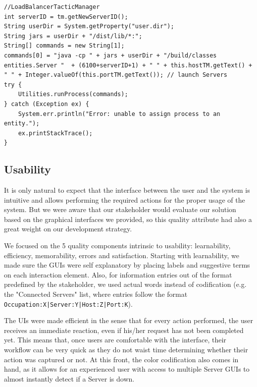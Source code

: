 \documentclass[12pt]{article}
\begin{document}
\begin{lstlisting}
//LoadBalancerTacticManager
int serverID = tm.getNewServerID();
String userDir = System.getProperty("user.dir");
String jars = userDir + "/dist/lib/*:";
String[] commands = new String[1];
commands[0] = "java -cp " + jars + userDir + "/build/classes entities.Server "  + (6100+serverID+1) + " " + this.hostTM.getText() + " " + Integer.valueOf(this.portTM.getText()); // launch Servers
try {
    Utilities.runProcess(commands);
} catch (Exception ex) {
    System.err.println("Error: unable to assign process to an entity.");
    ex.printStackTrace();
}
\end{lstlisting}

\subsection{Usability} \label{usability}

It is only natural to expect that the interface between the user and the system is intuitive and allows performing the required actions for the proper usage of
the system.
But we were aware that our stakeholder would evaluate our solution based on the graphical interfaces we provided, so this quality attribute had also a great
weight on our development strategy.

We focused on the 5 quality components intrinsic to usability: learnability, efficiency, memorability, errors and satisfaction.
Starting with learnability, we made sure the GUIs were self explanatory by placing labels and suggestive terms on each interaction element.
Also, for information entries out of the format predefined by the stakeholder, we used actual words instead of codification (e.g. the "Connected Servers" list,
where entries follow the format \texttt{Occupation:X|Server:Y|Host:Z|Port:K}).

The UIs were made efficient in the sense that for every action performed, the user receives an immediate reaction, even if his/her request has not been completed yet.
This means that, once users are comfortable with the interface, their workflow can be very quick as they do not waist time determining whether their action was
captured or not.
At this front, the color codification also comes in hand, as it allows for an experienced user with access to multiple Server GUIs to almost instantly detect
if a Server is down.
\end{document}

